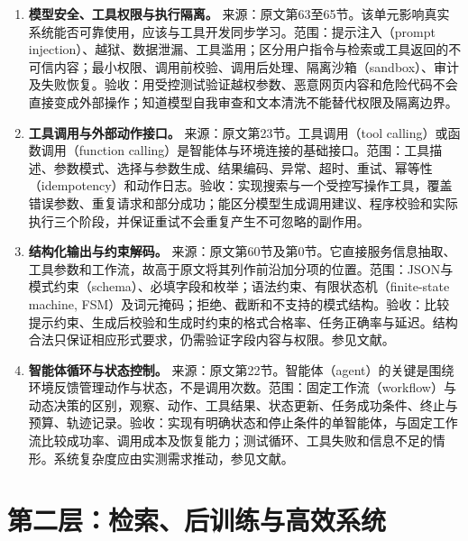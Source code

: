 \documentclass[UTF8,12pt,a4paper,fontset=fandol]{ctexart}
\begin{document}
\begin{enumerate}[label=\arabic*.,series=techrank]
\item \textbf{模型安全、工具权限与执行隔离。}\label{tech:safety}
来源：原文第63至65节。该单元影响真实系统能否可靠使用，应该与工具开发同步学习。范围：提示注入（prompt injection）、越狱、数据泄漏、工具滥用；区分用户指令与检索或工具返回的不可信内容；最小权限、调用前校验、调用后处理、隔离沙箱（sandbox）、审计及失败恢复。验收：用受控测试验证越权参数、恶意网页内容和危险代码不会直接变成外部操作；知道模型自我审查和文本清洗不能替代权限及隔离边界。

\item \textbf{工具调用与外部动作接口。}\label{tech:tool}
来源：原文第23节。工具调用（tool calling）或函数调用（function calling）是智能体与环境连接的基础接口。范围：工具描述、参数模式、选择与参数生成、结果编码、异常、超时、重试、幂等性（idempotency）和动作日志。验收：实现搜索与一个受控写操作工具，覆盖错误参数、重复请求和部分成功；能区分模型生成调用建议、程序校验和实际执行三个阶段，并保证重试不会重复产生不可忽略的副作用。

\item \textbf{结构化输出与约束解码。}\label{tech:structured}
来源：原文第60节及第0节。它直接服务信息抽取、工具参数和工作流，故高于原文将其列作前沿加分项的位置。范围：JSON与模式约束（schema）、必填字段和枚举；语法约束、有限状态机（finite-state machine, FSM）及词元掩码；拒绝、截断和不支持的模式结构。验收：比较提示约束、生成后校验和生成时约束的格式合格率、任务正确率与延迟。结构合法只保证相应形式要求，仍需验证字段内容与权限。参见文献\cite{vllmstructured}。

\item \textbf{智能体循环与状态控制。}\label{tech:agent}
来源：原文第22节。智能体（agent）的关键是围绕环境反馈管理动作与状态，不是调用次数。范围：固定工作流（workflow）与动态决策的区别，观察、动作、工具结果、状态更新、任务成功条件、终止与预算、轨迹记录。验收：实现有明确状态和停止条件的单智能体，与固定工作流比较成功率、调用成本及恢复能力；测试循环、工具失败和信息不足的情形。系统复杂度应由实测需求推动，参见文献\cite{agents}。
\end{enumerate}

\section{第二层：检索、后训练与高效系统}
\label{sec:main}
\end{document}
